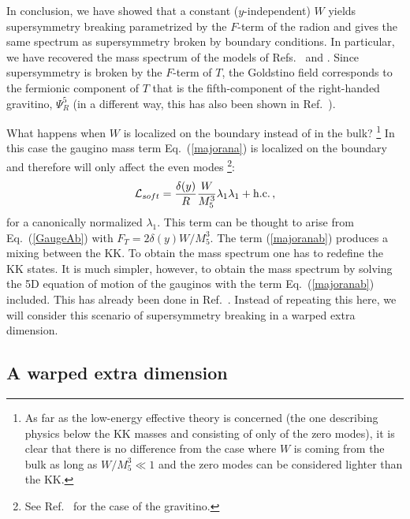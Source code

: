 \documentclass[a4paper,12pt]{article}
\begin{document}
In conclusion, we have showed that a constant ($y$-independent)
 $W$ yields 
 supersymmetry breaking parametrized
by the   $F$-term of the radion and gives
the same spectrum 
as  supersymmetry broken by boundary conditions.
In particular, we have recovered the mass spectrum of the models
of Refs.~\cite{pq} and \cite{bhn}.
Since supersymmetry is broken 
by the $F$-term of $T$, the Goldstino field corresponds
to  the  fermionic component of $T$ that is 
the fifth-component of the right-handed gravitino, $\Psi_R^5$
(in a different way, this  has also been shown
in Ref.~\cite{goldstino}).


What happens
when  $W$ is localized on the boundary instead of in the bulk?
\footnote{As far as the low-energy effective theory is concerned
(the one describing  physics below the KK masses and 
consisting of  only of the zero modes), it is clear
that there is no difference 
from  the case where $W$ is coming from the bulk as long as
$W/M^3_5\ll 1$ and the zero modes can be considered
 lighter than the KK.}
In this case
the gaugino mass term Eq.~(\ref{majorana}) is
localized on the boundary
and therefore will only affect the even modes
\footnote{See Ref.~\cite{fabio} for the case of the gravitino.}:
\begin{equation}
{\cal L}_{soft}=\frac{\delta(y)}{R}\frac{W}{M^3_5}\lambda_1\lambda_1+
\text{h.c.}\, ,
\label{majoranab}
\end{equation}
for a   canonically normalized $\lambda_1$. 
This term can be thought to arise  from Eq.~(\ref{GaugeAb})    with 
$F_T=2\delta(y)W/M^3_5$. 
The term (\ref{majoranab})
produces a mixing between the KK. To obtain 
the mass spectrum one has to redefine the KK states. 
It is much simpler, however,
to obtain the mass spectrum
by
 solving the 5D equation of motion of the gauginos with the term
Eq.~(\ref{majoranab}) included.
This  has already been done in Ref.~\cite{ahnsw}.
Instead of repeating this here, we will consider this
 scenario of supersymmetry breaking
in a  warped extra dimension.




\subsection{A warped extra dimension}
\end{document}
